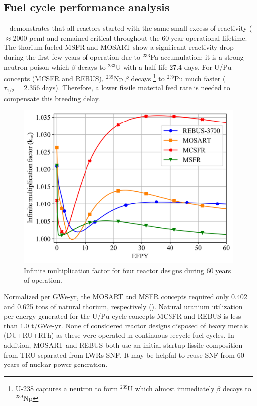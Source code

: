 \documentclass{anstrans}
\begin{document}
\subsection{Fuel cycle performance analysis} 
\label{sec:performance}
~ demonstrates that all reactors started with the same small excess of reactivity ($\approx$2000 pcm) and remained critical throughout the 60-year operational lifetime. The thorium-fueled \gls{MSFR} and \gls{MOSART} show a significant reactivity drop during the first few years of operation due to $^{233}$Pa accumulation; it is a strong neutron poison which $\beta$ decays to $^{233}$U with a half-life 27.4 days. For U/Pu concepts (\gls{MCSFR} and REBUS), $^{239}$Np $\beta$ decays \footnote{U-238 captures a neutron to form $^{239}$U which almost immediately $\beta$ decays to $^{239}$Np} to $^{239}$Pu much faster ($\tau_{1/2}=2.356$ days). Therefore, a lower fissile material feed rate is needed to compensate this breeding delay.
\begin{figure}[!htb]
  \centering
  \includegraphics[scale=0.585]{./Figures/k_inf.png}
  \vspace{-0.25in}
  \caption{Infinite multiplication factor for four reactor designs during 60 years of operation.}   
  \label{fig:k_inf}
\end{figure}

Normalized per GWe-yr, the \gls{MOSART} and \gls{MSFR} concepts required only 0.402 and 0.625 tons of natural thorium, respectively (). Natural uranium utilization per energy generated for the U/Pu cycle concepts \gls{MCSFR} and REBUS is less than 1.0 t/GWe-yr. None of considered reactor designs disposed of heavy metals (\gls{DU}+\gls{RU}+\gls{RTh}) as these were operated in continuous recycle fuel cycles.
In addition, \gls{MOSART} and REBUS both use an initial startup fissile composition from \gls{TRU} separated from \glspl{LWR} \gls{SNF}. It may be helpful to reuse \gls{SNF} from 60 years of nuclear power generation. 
\end{document}
